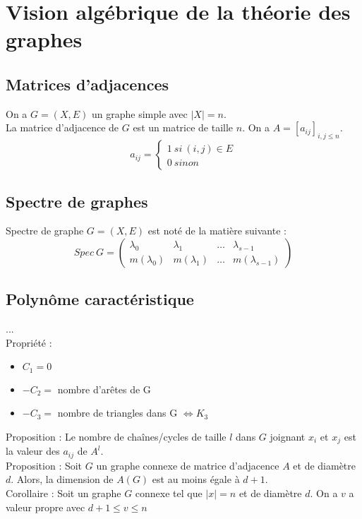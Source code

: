 \section{Vision algébrique de la théorie des graphes}
\subsection{Matrices d'adjacences}
On a $G=\left(X,E\right)$ un graphe simple avec $|X|=n$.\\
La matrice d'adjacence de $G$ est un matrice de taille $n$. On a $A=[a_{ij}]_{i,j \leqslant n}$.
\begin{equation}
 a_{ij}=\left\{
    \begin{array}{ll}
     1~si~(i,j)\in E\\
     0~sinon
    \end{array}
  \right.
\end{equation}
\subsection{Spectre de graphes}
Spectre de graphe $G=(X,E)$ est noté de la matière suivante :
\begin{equation}
 Spec~G=
 \begin{pmatrix}
  \lambda_{0} & \lambda_{1} & \ldots & \lambda_{s-1}\\
  m(\lambda_{0}) & m(\lambda_{1}) & \ldots & m(\lambda_{s-1})
 \end{pmatrix}
\end{equation}
\subsection{Polynôme caractéristique}
...\\
Propriété : 
\begin{itemize}
 \item $C_1=0$
 \item $-C_2=$ nombre d'arêtes de G
 \item $-C_3=$ nombre de triangles dans G $\Leftrightarrow K_3$
\end{itemize}

Proposition : Le nombre de chaînes/cycles de taille $l$ dans $G$ joignant $x_i$ et $x_j$ est la valeur des $a_{ij}$ de $A^l$.\\
Proposition : Soit $G$ un graphe connexe de matrice d'adjacence $A$ et de diamètre $d$. Alors, la dimension de $A(G)$ est au moins égale à $d+1$.\\
Corollaire : Soit un graphe $G$ connexe tel que $|x|=n$ et de diamètre $d$. On a $v$ a valeur propre avec $d+1 \leqslant v\leqslant n$